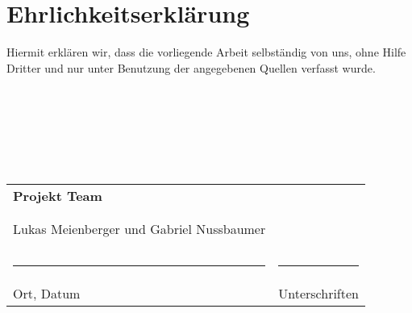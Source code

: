 \section{Ehrlichkeitserklärung}

Hiermit erklären wir, dass die vorliegende Arbeit selbständig von uns, ohne Hilfe Dritter und nur unter Benutzung der angegebenen Quellen verfasst wurde.\\
\\
\\
\\
\\
\\
\\

	\begin{tabular}{l l}
	\textbf{Projekt Team} \\
	\\
	\\
	Lukas Meienberger und Gabriel Nussbaumer \\ 
	\\
	\\
		\rule{44mm}{.15mm} & \hspace{1mm} \rule{70mm}{.15mm} \\
	Ort, Datum & \hspace{1mm} Unterschriften \\
	
\end{tabular}\\